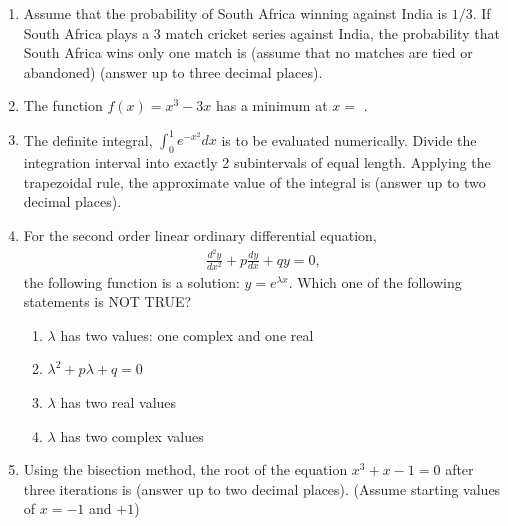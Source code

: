 \documentclass[journal]{IEEEtran}
\theoremstyle{remark}
\begin{document}
\begin{enumerate}
\item Assume that the probability of South Africa winning against India is $1/3$. If South Africa plays a 3 match cricket series against India, the probability that South Africa wins only one match is \underline {\hspace{2cm}} (assume that no matches are tied or abandoned) (answer up to three decimal places). \hfill{}

\item The function $f(x)=x^3-3x$ has a minimum at $x=$ \underline {\hspace{2cm}}. \hfill{}

\item The definite integral, $\int_{0}^{1}e^{-x^{2}}dx$ is to be evaluated numerically. Divide the integration interval into exactly 2 subintervals of equal length. Applying the trapezoidal rule, the approximate value of the integral is \underline {\hspace{2cm}} (answer up to two decimal places). \hfill{}

\item For the second order linear ordinary differential equation,
\begin{align}
\frac{d^{2}y}{dx^{2}}+p\frac{dy}{dx}+qy=0,
\end{align}
the following function is a solution: $y=e^{\lambda x}$. Which one of the following statements is NOT TRUE? \hfill{}

\begin{enumerate}
    \item $\lambda$ has two values: one complex and one real
    \item $\lambda^2 + p\lambda + q = 0$
    \item $\lambda$ has two real values
    \item $\lambda$ has two complex values
\end{enumerate}


\item Using the bisection method, the root of the equation $x^3+x-1=0$ after three iterations is \underline {\hspace{2cm}} (answer up to two decimal places). (Assume starting values of $x=-1$ and $+1$) \hfill{}


\end{enumerate}
\end{document}
